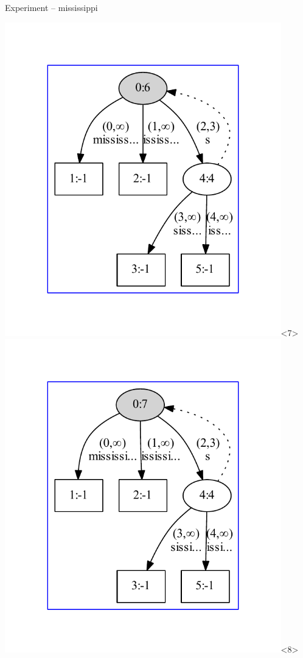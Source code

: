 \begin{frame}{Experiment -- mississippi}
\begin{overlayarea}{\textwidth}{\textheight}
\includegraphics[keepaspectratio,height=0.9\textheight,width=0.9\textwidth]{mississ.pdf}<7>
\includegraphics[keepaspectratio,height=0.9\textheight,width=0.9\textwidth]{mississi.pdf}<8>

\end{overlayarea}
\end{frame}

